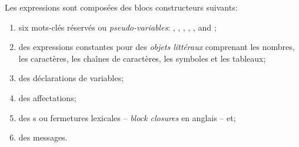 \documentclass[a4paper,10pt,twoside]{book}
\begin{document}
Les expressions sont composées des blocs constructeurs suivants:
\begin{enumerate}[label=(\small\itshape\roman{*}), ref=(\small\itshape\roman{*})]
\item six mots-clés réservés ou \emph{pseudo-variables}:
, , , , , and ;
\item des expressions constantes pour des \emph{objets littéraux} comprenant les nombres, les caractères, les chaînes de caractères, les symboles et les tableaux;
\item des déclarations de variables;
\item des affectations;
\item des s ou fermetures lexicales -- \emph{block closures} en anglais -- et;
\item des messages.
\end{enumerate}
\end{document}
